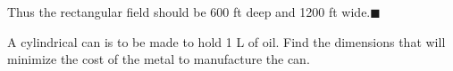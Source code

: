 \documentclass{sebase}
\begin{document}
\begin{Solution}
[Alternatively, we could have observed that $A^{\prime \prime }(x)=-4<0$ for
all $x$, so $A$ is always concave downward and the local maximum at $x=600$
must be an absolute maximum.]

Thus the rectangular field should be 600 ft deep and 1200 ft wide.\vspace*{%
-21pt}$\blacksquare $
\end{Solution}

\begin{Example}[2]
\VIDEO%
%
A cylindrical can is to be made to hold 1 L of oil. Find the dimensions that
will minimize the cost of the metal to manufacture the can.
\end{Example}
\end{document}
